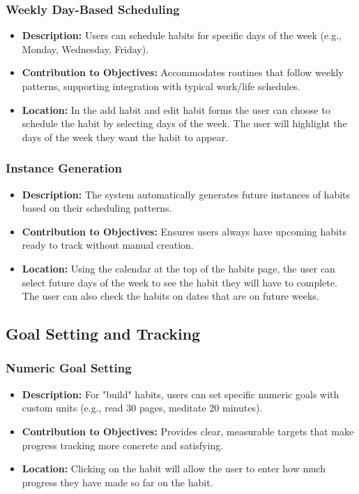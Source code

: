 \subsubsection{Weekly Day-Based Scheduling}
\begin{itemize}
    \item \textbf{Description:} Users can schedule habits for specific days of the week (e.g., Monday, Wednesday, Friday).
    \item \textbf{Contribution to Objectives:} Accommodates routines that follow weekly patterns, supporting integration with typical work/life schedules.
    \item \textbf{Location:} In the add habit and edit habit forms the user can choose to schedule the habit by selecting days of the week. The user will highlight the days of the week they want the habit to appear.
\end{itemize}

\subsubsection{Instance Generation}
\begin{itemize}
    \item \textbf{Description:} The system automatically generates future instances of habits based on their scheduling patterns.
    \item \textbf{Contribution to Objectives:} Ensures users always have upcoming habits ready to track without manual creation.
    \item \textbf{Location:} Using the calendar at the top of the habits page, the user can select future days of the week to see the habit they will have to complete. The user can also check the habits on dates that are on future weeks.
\end{itemize}

\subsection{Goal Setting and Tracking}
\subsubsection{Numeric Goal Setting}
\begin{itemize}
    \item \textbf{Description:} For "build" habits, users can set specific numeric goals with custom units (e.g., read 30 pages, meditate 20 minutes).
    \item \textbf{Contribution to Objectives:} Provides clear, measurable targets that make progress tracking more concrete and satisfying.
    \item \textbf{Location:} Clicking on the habit will allow the user to enter how much progress they have made so far on the habit.
\end{itemize}

